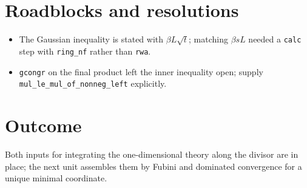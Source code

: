 \documentclass[11pt]{article}
\begin{document}
\section{Roadblocks and resolutions}
\begin{itemize}
\item The Gaussian inequality is stated with $\beta L\sqrt t$; matching $\beta sL$ needed a
\texttt{calc} step with \texttt{ring\_nf} rather than \texttt{rwa}.
\item \texttt{gcongr} on the final product left the inner inequality open; supply
\texttt{mul\_le\_mul\_of\_nonneg\_left} explicitly.
\end{itemize}

\section{Outcome}
Both inputs for integrating the one-dimensional theory along the divisor are in place; the next unit
assembles them by Fubini and dominated convergence for a unique minimal coordinate.
\end{document}
